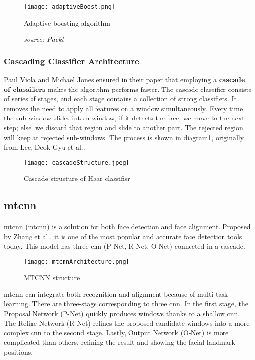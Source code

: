\begin{figure}[H]
    \centering
    \texttt{[image: adaptiveBoost.png]}
    \caption{Adaptive boosting algorithm}
    \caption*{\textit{source: Packt}}
\end{figure}

\subsubsection{Cascading Classifier Architecture}
Paul Viola and Michael Jones ensured in their paper that employing a \textbf{cascade of classifiers} makes the algorithm performs faster. The cascade classifier consists of series of stages, and each stage contains a collection of strong classifiers. It removes the need to apply all features on a window simultaneously. Every time the sub-window slides into a window, if it detects the face, we move to the next step; else, we discard that region and slide to another part. The rejected region will keep at rejected sub-windows. The process is shown in diagram\ref{fig:cascadeStructure}, originally from Lee, Deok Gyu et al.\cite{article}.

\begin{figure}[H]
    \centering
    \texttt{[image: cascadeStructure.jpeg]}
    \caption{Cascade structure of Haar classifier}
    \label{fig:cascadeStructure}
\end{figure}

\subsection{\acrlong{mtcnn}}
\paragraph{}
\acrlong{mtcnn} (\acrshort{mtcnn}) is a solution for both face detection and face alignment. Proposed by Zhang et al.\cite{Zhang_2016}, it is one of the most popular and accurate face detection tools today. This model has three \acrlong{cnn} (P-Net, R-Net, O-Net) connected in a cascade.

\begin{figure}[H]
    \centering
    \texttt{[image: mtcnnArchitecture.png]}
    \caption{MTCNN structure}
\end{figure}

\acrshort{mtcnn} can integrate both recognition and alignment because of multi-task learning. There are three-stage corresponding to three \acrshort{cnn}. In the first stage, the Proposal Network (P-Net) quickly produces windows thanks to a shallow \acrshort{cnn}. The Refine Network (R-Net) refines the proposed candidate windows into a more complex \acrshort{cnn} to the second stage. Lastly, Output Network (O-Net) is more complicated than others, refining the result and showing the facial landmark positions.

